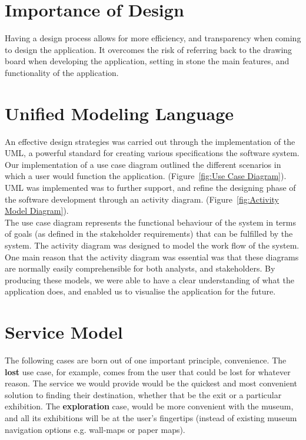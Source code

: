 
\section{Importance of Design}
Having a design process allows for more efficiency, and transparency when coming to design the application. It overcomes the risk of referring back to the drawing board when developing the application, setting in stone the main features, and functionality of the application.

\section{Unified Modeling Language}
An effective design strategies was carried out through the implementation of the UML, a powerful standard for creating various specifications the software system.\\

Our implementation of a use case diagram outlined the different scenarios in which a user would function the application. (Figure~\ref{fig:Use Case Diagram}). UML was implemented was to further support, and refine the designing phase of the software development through an activity diagram. (Figure~\ref{fig:Activity Model Diagram}).\\

The use case diagram represents the functional behaviour of the system in terms of goals (as defined in the stakeholder requirements) that can be fulfilled by the system. The activity diagram was designed to model the work flow of the system. One main reason that the activity diagram was essential was that these diagrams are normally easily comprehensible for both analysts, and stakeholders. By producing these models, we were able to have a clear understanding of what the application does, and enabled us to visualise the application for the future.

\section{Service Model}
The following cases are born out of one important principle, convenience. The \textbf{lost} use case, for example, comes from the user that could be lost for whatever reason. The service we would provide would be the quickest and most convenient solution to finding their destination, whether that be the exit or a particular exhibition. The \textbf{exploration} case, would be more convenient with the museum, and all its exhibitions will be at the user's fingertips (instead of existing museum navigation options e.g. wall-maps or paper maps).

